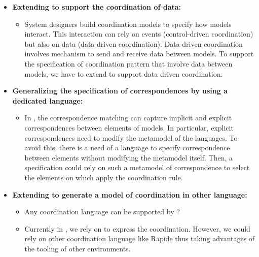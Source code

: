 \begin{itemize}
	\item \textbf{Extending \bcool to support the coordination of data:} 
	\begin{itemize}
		\item System designers build coordination models to specify how models interact. This interaction can rely on events (\ie control-driven coordination) but also on data (\ie data-driven coordination). Data-driven coordination involves mechanism to send and receive data between models. To support the specification of coordination pattern that involve data between models, we have to extend \bcool to support data driven coordination.   
	\end{itemize}
	
	\item \textbf{Generalizing the specification of correspondences by using a dedicated language:}
		\begin{itemize}
			\item In \bcool, the correspondence matching can capture implicit and explicit correspondences between elements of models. In particular, explicit correspondences need to modify the metamodel of the languages. To avoid this, there is a need of a language to specify correspondence between elements without modifying the metamodel itself. Then, a \bcool specification could rely on such a metamodel of correspondence to select the elements on which apply the coordination rule. 
		\end{itemize}
			\item \textbf{Extending \bcool to generate a model of coordination in other language:} 
			\begin{itemize}
				\item Any coordination language can be supported by \bcool?
				\item Currently in \bcool, we rely on \ccsl to express the coordination. However, we could rely on other coordination language like Rapide thus taking advantages of the tooling of other environments.        
			\end{itemize}
\end{itemize}
